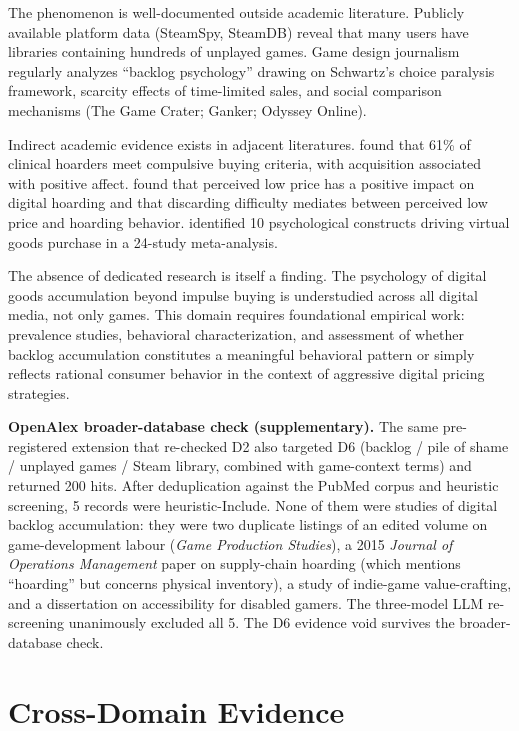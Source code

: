 \documentclass[12pt]{article}
\begin{document}
The phenomenon is well-documented outside academic literature. Publicly available platform data (SteamSpy, SteamDB) reveal that many users have libraries containing hundreds of unplayed games. Game design journalism regularly analyzes ``backlog psychology'' drawing on Schwartz's choice paralysis framework, scarcity effects of time-limited sales, and social comparison mechanisms (The Game Crater; Ganker; Odyssey Online).

Indirect academic evidence exists in adjacent literatures. \citet{Frost1998} found that 61\% of clinical hoarders meet compulsive buying criteria, with acquisition associated with positive affect. \citet{Vinoi2024} found that perceived low price has a positive impact on digital hoarding and that discarding difficulty mediates between perceived low price and hoarding behavior. \citet{Hamari2017} identified 10 psychological constructs driving virtual goods purchase in a 24-study meta-analysis.

The absence of dedicated research is itself a finding. The psychology of digital goods accumulation beyond impulse buying is understudied across all digital media, not only games. This domain requires foundational empirical work: prevalence studies, behavioral characterization, and assessment of whether backlog accumulation constitutes a meaningful behavioral pattern or simply reflects rational consumer behavior in the context of aggressive digital pricing strategies.

\textbf{OpenAlex broader-database check (supplementary).} The same pre-registered extension that re-checked D2 also targeted D6 (backlog / pile of shame / unplayed games / Steam library, combined with game-context terms) and returned 200 hits. After deduplication against the PubMed corpus and heuristic screening, 5 records were heuristic-Include. None of them were studies of digital backlog accumulation: they were two duplicate listings of an edited volume on game-development labour (\textit{Game Production Studies}), a 2015 \textit{Journal of Operations Management} paper on supply-chain hoarding (which mentions ``hoarding'' but concerns physical inventory), a study of indie-game value-crafting, and a dissertation on accessibility for disabled gamers. The three-model LLM re-screening unanimously excluded all 5. The D6 evidence void survives the broader-database check.

\section{Cross-Domain Evidence}
\end{document}
